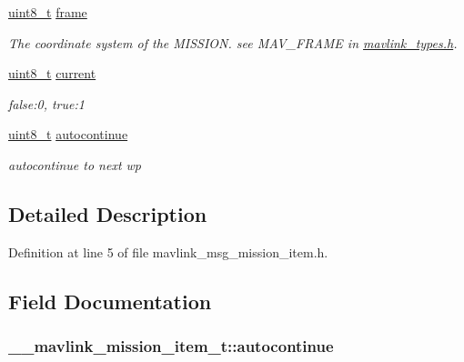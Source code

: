\begin{DoxyCompactItemize}
\hyperlink{stdint_8h_aba7bc1797add20fe3efdf37ced1182c5}{uint8\-\_\-t} \hyperlink{struct____mavlink__mission__item__t_aa3b25a65ef4d62f208ea6d3856b418cb}{frame}
\begin{DoxyCompactList}\small\item\em The coordinate system of the M\-I\-S\-S\-I\-O\-N. see M\-A\-V\-\_\-\-F\-R\-A\-M\-E in \hyperlink{mavlink__types_8h}{mavlink\-\_\-types.\-h}. \end{DoxyCompactList}\item 
\hyperlink{stdint_8h_aba7bc1797add20fe3efdf37ced1182c5}{uint8\-\_\-t} \hyperlink{struct____mavlink__mission__item__t_aa9fdaa647214fcb6bb21e05f2718f56f}{current}
\begin{DoxyCompactList}\small\item\em false\-:0, true\-:1 \end{DoxyCompactList}\item 
\hyperlink{stdint_8h_aba7bc1797add20fe3efdf37ced1182c5}{uint8\-\_\-t} \hyperlink{struct____mavlink__mission__item__t_a2f276d223a22308aed2978c1718bf74f}{autocontinue}
\begin{DoxyCompactList}\small\item\em autocontinue to next wp \end{DoxyCompactList}\end{DoxyCompactItemize}


\subsection{Detailed Description}


Definition at line 5 of file mavlink\-\_\-msg\-\_\-mission\-\_\-item.\-h.



\subsection{Field Documentation}
\hypertarget{struct____mavlink__mission__item__t_a2f276d223a22308aed2978c1718bf74f}{
\subsubsection[{autocontinue}]{ \-\_\-\-\_\-mavlink\-\_\-mission\-\_\-item\-\_\-t\-::autocontinue}}\label{struct____mavlink__mission__item__t_a2f276d223a22308aed2978c1718bf74f}


